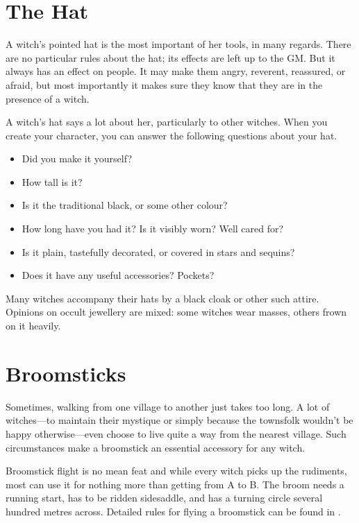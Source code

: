 \section{The Hat}

A witch's pointed hat is the most important of her tools, in many regards.
There are no particular rules about the hat; its effects are left up to the GM.
But it always has an effect on people.
It may make them angry, reverent, reassured, or afraid, but most importantly it makes sure they know that they are in the presence of a witch.

A witch's hat says a lot about her, particularly to other witches.
When you create your character, you can answer the following questions about your hat.

\begin{itemize}
	\item Did you make it yourself?
	\item How tall is it?
	\item Is it the traditional black, or some other colour?
	\item How long have you had it?
		Is it visibly worn?
		Well cared for?
	\item Is it plain, tastefully decorated, or covered in stars and sequins?
	\item Does it have any useful accessories?
		Pockets?
\end{itemize}

Many witches accompany their hats by a black cloak or other such attire.
Opinions on occult jewellery are mixed: some witches wear masses, others frown on it heavily.



\section{Broomsticks}

Sometimes, walking from one village to another just takes too long.
A lot of witches---to maintain their mystique or simply because the townsfolk wouldn't be happy otherwise---even choose to live quite a way from the nearest village.
Such circumstances make a broomstick an essential accessory for any witch.

Broomstick flight is no mean feat and while every witch picks up the rudiments, most can use it for nothing more than getting from A to B.
The broom needs a running start, has to be ridden sidesaddle, and has a turning circle several hundred metres across.
Detailed rules for flying a broomstick can be found in .


